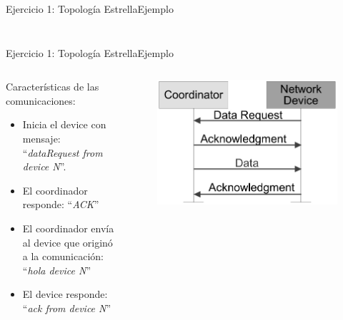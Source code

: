 \documentclass[aspectratio=169]{beamer}
\begin{document}
\begin{frame}[t]{Ejercicio 1: Topología Estrella}{Ejemplo}
\begin{columns}[t]
\begin{column}{.5\textwidth}
\begin{minipage}[t][0.7\textheight][s]{\columnwidth}
\begin{figure}[H]
            \end{figure}            
        \end{minipage}
    \end{column}
\end{columns}          
\end{frame}

\begin{frame}[t]{Ejercicio 1: Topología Estrella}{Ejemplo}
\begin{columns}[t]
    \begin{column}{.5\textwidth}
        \begin{minipage}[t][0.7\textheight][s]{\columnwidth}
        Características de las comunicaciones:
        \vspace{10px}
		\begin{itemize}
			\item Inicia el device con mensaje: 
			``\textit{dataRequest from device N}''.
			\vspace{5px}			
			\item El coordinador responde: ``\textit{ACK}''
			\vspace{5px}
			\item El coordinador envía al device que originó a la comunicación: ``\textit{hola device N}''
			\vspace{5px}
			\item El device responde:\\``\textit{ack from device N}''
            \end{itemize}        
            \end{minipage}
    \end{column}
    \begin{column}{.5\textwidth}
        \begin{minipage}[t][0.7\textheight][s]{\columnwidth}
            \begin{figure}[H]
                \includegraphics[height=.5\textheight]{./imagenes/coord-dev-sinbeacon.jpg}

\end{figure}
\end{minipage}
\end{column}
\end{columns}
\end{frame}
\end{document}
